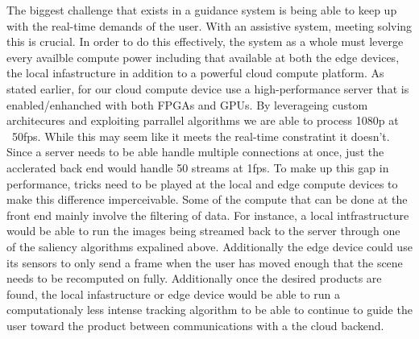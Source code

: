The biggest challenge that exists in a guidance system is being able to keep up with the real-time demands of the user. With an assistive system, meeting solving this is crucial. In order to do this effectively, the system as a whole must leverge every availble compute power including that available at both the edge devices, the local infastructure in addition to a powerful cloud compute platform. As stated earlier, for our cloud compute device use a high-performance server that is enabled/enhanched with both FPGAs and GPUs. By leverageing custom architecures and exploiting parrallel algorithms we are able to process 1080p at ~50fps. While this may seem like it meets the real-time constratint it doesn't. Since a server needs to be able handle multiple connections at once, just the acclerated back end would handle 50 streams at 1fps. To make up this gap in performance, tricks need to be played at the local and edge compute devices to make this difference imperceivable. Some of the compute that can be done at the front end mainly involve the filtering of data. For instance, a local intfrastructure would be able to run the images being streamed back to the server through one of the saliency algorithms expalined above. Additionally the edge device could use its sensors to only send a frame when the user has moved enough that the scene needs to be recomputed on fully. Additionally once the desired products are found, the local infastructure or edge device would be able to run a computationaly less intense tracking algorithm to be able to continue to guide the user toward the product between communications with a the cloud backend.

